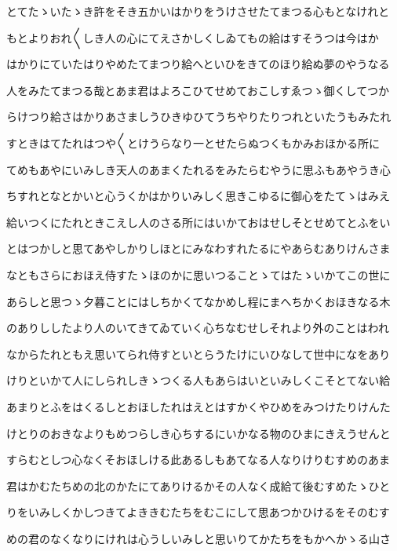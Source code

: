 \documentclass[a4paper,11pt,landscape]{ltjtarticle}
\begin{document}
とてたゝいたゝき許をそき五かいはかりをうけさせたてまつる心もとなけれと
\par\medskip
もとよりおれ〱しき人の心にてえさかしくしゐてもの給はすそうつは今はか
\par\medskip
はかりにていたはりやめたてまつり給へといひをきてのほり給ぬ夢のやうなる
\par\medskip
人をみたてまつる哉とあま君はよろこひてせめておこしすゑつゝ御くしてつか
\par\medskip
らけつり給さはかりあさましうひきゆひてうちやりたりつれといたうもみたれ
\par\medskip
すときはてたれはつや〱とけうらなり一とせたらぬつくもかみおほかる所に
\par\medskip
てめもあやにいみしき天人のあまくたれるをみたらむやうに思ふもあやうき心
\par\medskip
ちすれとなとかいと心うくかはかりいみしく思きこゆるに御心をたてゝはみえ
\par\medskip
給いつくにたれときこえし人のさる所にはいかておはせしそとせめてとふをい
\par\medskip
とはつかしと思てあやしかりしほとにみなわすれたるにやあらむありけんさま
\par\medskip
なともさらにおほえ侍すたゝほのかに思いつることゝてはたゝいかてこの世に
\par\medskip
あらしと思つゝ夕暮ことにはしちかくてなかめし程にまへちかくおほきなる木
\par\medskip
のありししたより人のいてきてゐていく心ちなむせしそれより外のことはわれ
\par\medskip
なからたれともえ思いてられ侍すといとらうたけにいひなして世中になをあり
\par\medskip
けりといかて人にしられしきゝつくる人もあらはいといみしくこそとてない給
\par\medskip
あまりとふをはくるしとおほしたれはえとはすかくやひめをみつけたりけんた
\par\medskip
けとりのおきなよりもめつらしき心ちするにいかなる物のひまにきえうせんと
\par\medskip
すらむとしつ心なくそおほしける此あるしもあてなる人なりけりむすめのあま
\par\medskip
君はかむたちめの北のかたにてありけるかその人なく成給て後むすめたゝひと
\par\medskip
りをいみしくかしつきてよききむたちをむこにして思あつかひけるをそのむす
\par\medskip
めの君のなくなりにけれは心うしいみしと思いりてかたちをもかへかゝる山さ
\par\medskip
\end{document}
